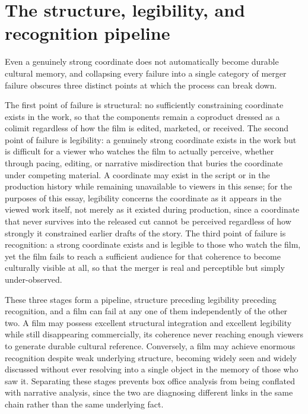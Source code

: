 \documentclass[11pt]{article}
\begin{document}
\section{The structure, legibility, and recognition pipeline}

Even a genuinely strong coordinate does not automatically become durable cultural memory, and collapsing every failure into a single category of merger failure obscures three distinct points at which the process can break down.

The first point of failure is structural: no sufficiently constraining coordinate exists in the work, so that the components remain a coproduct dressed as a colimit regardless of how the film is edited, marketed, or received. The second point of failure is legibility: a genuinely strong coordinate exists in the work but is difficult for a viewer who watches the film to actually perceive, whether through pacing, editing, or narrative misdirection that buries the coordinate under competing material. A coordinate may exist in the script or in the production history while remaining unavailable to viewers in this sense; for the purposes of this essay, legibility concerns the coordinate as it appears in the viewed work itself, not merely as it existed during production, since a coordinate that never survives into the released cut cannot be perceived regardless of how strongly it constrained earlier drafts of the story. The third point of failure is recognition: a strong coordinate exists and is legible to those who watch the film, yet the film fails to reach a sufficient audience for that coherence to become culturally visible at all, so that the merger is real and perceptible but simply under-observed.

These three stages form a pipeline, structure preceding legibility preceding recognition, and a film can fail at any one of them independently of the other two. A film may possess excellent structural integration and excellent legibility while still disappearing commercially, its coherence never reaching enough viewers to generate durable cultural reference. Conversely, a film may achieve enormous recognition despite weak underlying structure, becoming widely seen and widely discussed without ever resolving into a single object in the memory of those who saw it. Separating these stages prevents box office analysis from being conflated with narrative analysis, since the two are diagnosing different links in the same chain rather than the same underlying fact.
\end{document}
